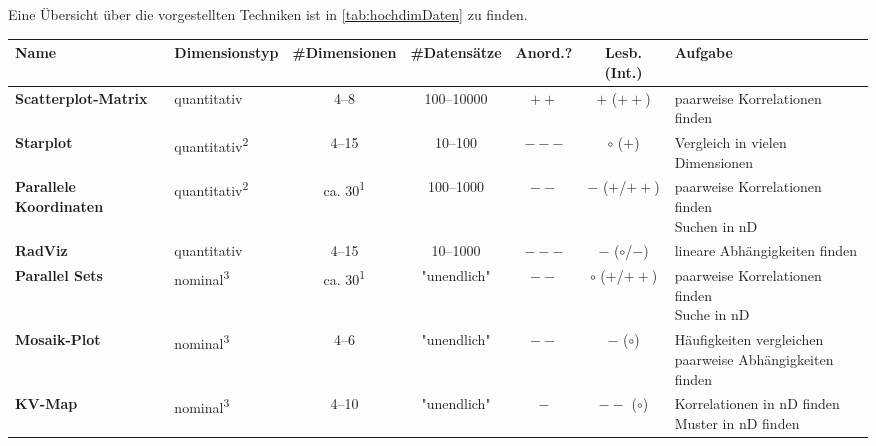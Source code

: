 Eine Übersicht über die vorgestellten Techniken ist in \autoref{tab:hochdimDaten} zu finden.

\begin{table}
	\centering
	\begin{tabular}{l|lccccl}
		\toprule
		\textbf{Name}                  & \textbf{Dimensionstyp}         & \textbf{\#Dimensionen}          & \textbf{\#Datensätze} & \textbf{Anord.?} & \textbf{Lesb. (Int.)}    & \textbf{Aufgabe}                                                                 \\ \midrule
		\textbf{Scatterplot-Matrix}    & quantitativ                    & \numrange{4}{8}                 & \numrange{100}{10000} & \(++\)           & \(+\) (\(++\))           & paarweise Korrelationen finden                                                   \\ \midrule
		\textbf{Starplot}              & quantitativ\textsuperscript{2} & \numrange{4}{15}                & \numrange{10}{100}    & \(---\)          & \(\circ\) (\(+\))        & Vergleich in vielen Dimensionen                                                  \\ \midrule
		\textbf{Parallele Koordinaten} & quantitativ\textsuperscript{2} & ca. \num{30}\textsuperscript{1} & \numrange{100}{1000}  & \(--\)           & \(-\) (\(+\)/\(++\))     & \multirowcell{2}[][l]{paarweise Korrelationen finden\\Suchen in nD}              \\ \midrule
		\textbf{RadViz}                & quantitativ                    & \numrange{4}{15}                & \numrange{10}{1000}   & \(---\)          & \(-\) (\(\circ\)/\(-\))  & lineare Abhängigkeiten finden                                                    \\ \midrule
		\textbf{Parallel Sets}         & nominal\textsuperscript{3}     & ca. \num{30}\textsuperscript{1} & "unendlich"           & \(--\)           & \(\circ\) (\(+\)/\(++\)) & \multirowcell{2}[][l]{paarweise Korrelationen finden\\Suche in nD}               \\ \midrule
		\textbf{Mosaik-Plot}           & nominal\textsuperscript{3}     & \numrange{4}{6}                 & "unendlich"           & \(--\)           & \(-\) (\(\circ\))        & \multirowcell{2}[][l]{Häufigkeiten vergleichen\\paarweise Abhängigkeiten finden} \\ \midrule
		\textbf{KV-Map}                & nominal\textsuperscript{3}     & \numrange{4}{10}                & "unendlich"           & \(-\)            & \(--\) (\(\circ\))       & \multirowcell{2}[][l]{Korrelationen in nD finden\\Muster in nD finden}           \\ \midrule

\end{tabular}
\end{table}
